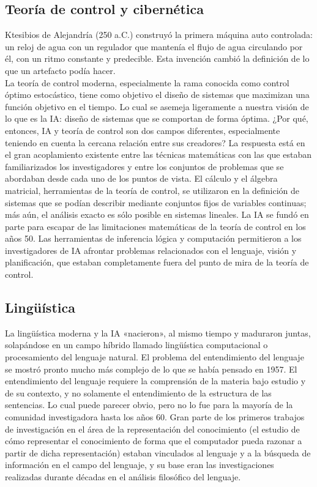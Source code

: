 \documentclass[12pt,a4paper]{report}
\begin{document}
\subsection*{Teoría de control y cibernética}
Ktesibios de Alejandría (250 a.C.) construyó la primera máquina auto controlada: un reloj de agua con un regulador que mantenía el flujo de agua circulando por él, con un ritmo constante y predecible. Esta invención cambió la definición de lo que un artefacto podía hacer.\\La teoría de control moderna, especialmente la rama conocida como control óptimo estocástico, tiene como objetivo el diseño de sistemas que maximizan una función objetivo en el tiempo. Lo cual se asemeja ligeramente a nuestra visión de lo que es la IA: diseño de sistemas que se comportan de forma óptima. ¿Por qué, entonces, IA y teoría de control son dos campos diferentes, especialmente teniendo en cuenta la cercana relación entre sus creadores? La respuesta está en el gran acoplamiento existente entre las técnicas matemáticas con las que estaban familiarizados los investigadores y entre los conjuntos de problemas que se abordaban desde cada uno de los puntos de vista. El cálculo y el álgebra matricial, herramientas de la teoría de control, se utilizaron en la definición de sistemas que se podían describir mediante conjuntos fijos de variables continuas; más aún, el análisis exacto es sólo posible en sistemas lineales. La IA se fundó en parte para escapar de las limitaciones matemáticas de la teoría de control en los años 50. Las herramientas de inferencia lógica y computación permitieron a los investigadores de IA afrontar problemas relacionados con el lenguaje, visión y planificación, que estaban completamente fuera del punto de mira de la teoría de control.
\subsection*{Lingüística}
La lingüística moderna y la IA «nacieron», al mismo tiempo y maduraron juntas, solapándose en un campo híbrido llamado lingüística computacional o procesamiento del lenguaje natural. El problema del entendimiento del lenguaje se mostró pronto mucho más complejo de lo que se había pensado en 1957. El entendimiento del lenguaje requiere la comprensión de la materia bajo estudio y de su contexto, y no solamente el entendimiento de la estructura de las sentencias. Lo cual puede parecer obvio, pero no lo fue para la mayoría de la comunidad investigadora hasta los años 60. Gran parte de los primeros trabajos de investigación en el área de la representación del conocimiento (el estudio de cómo representar el conocimiento de forma que el computador pueda razonar a partir de dicha representación) estaban vinculados al lenguaje y a la búsqueda de información en el campo del lenguaje, y su base eran las investigaciones realizadas durante décadas en el análisis filosófico del lenguaje.
\end{document}
